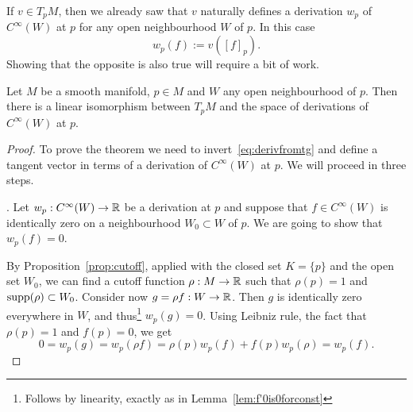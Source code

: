 If $v\in T_p M$, then we already saw that $v$ naturally defines a derivation $w_p$ of $C^\infty(W)$ at $p$ for any open neighbourhood $W$ of $p$.
In this case
\begin{equation}\label{eq:derivfromtg}
	w_p(f) := v([f]_p).
\end{equation}
Showing that the opposite is also true will require a bit of work.

\begin{proposition}\label{prop:derivations_tangent}
	Let $M$ be a smooth manifold, $p\in M$ and $W$ any open neighbourhood of $p$.
	Then there is a linear isomorphism between $T_p M$ and the space of derivations of $C^\infty(W)$ at $p$.
\end{proposition}
\begin{proof}
	To prove the theorem we need to invert~\eqref{eq:derivfromtg} and define a tangent vector in terms of a derivation of $C^\infty(W)$ at $p$.
	We will proceed in three steps.

	. Let $w_p:C^\infty(W) \to\mathbb{R}$ be a derivation at $p$ and suppose that $f\in C^\infty(W)$ is identically zero on a neighbourhood $W_0\subset W$ of $p$.
	We are going to show that $w_p(f)=0$.

	By Proposition~\ref{prop:cutoff}, applied with the closed set $K=\{p\}$ and the open set $W_0$, we can find a cutoff function $\rho:M\to\mathbb{R}$ such that $\rho(p)=1$ and $\operatorname{supp}(\rho) \subset W_0$. Consider now $g = \rho f : W \to \mathbb{R}$.
	Then $g$ is identically zero everywhere in $W$, and thus\footnote{Follows by linearity, exactly as in Lemma~\ref{lem:f'0is0forconst}} $w_p(g) = 0$.
	Using Leibniz rule, the fact that $\rho(p)=1$ and $f(p) = 0$, we get
	\begin{equation}
		0 = w_p(g) = w_p(\rho f) = \rho(p) w_p(f) + f(p)w_p(\rho) = w_p(f).
	\end{equation}


\end{proof}
